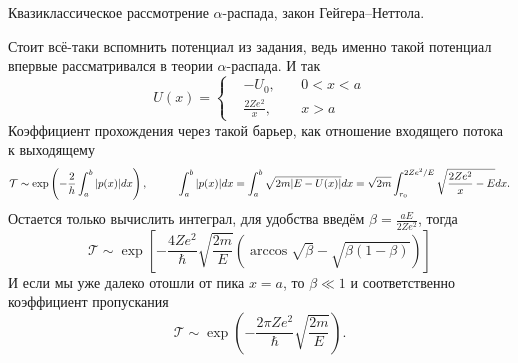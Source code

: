 \begin{leftrules}
	Квазиклассическое рассмотрение $\alpha$-распада, закон Гейгера–Неттола.
\end{leftrules}
Стоит всё-таки вспомнить потенциал из задания, ведь именно такой потенциал впервые рассматривался в теории $\alpha$-распада.
И так
\begin{equation*}
	U(x) = \left\{
	\begin{aligned}
		& - U_0, &\ &0<x<a\\
		& \tfrac{2 Z e^2}{x}, &\ &x > a
	\end{aligned}
	\right.
\end{equation*}
 Коэффициент прохождения через такой барьер, как отношение входящего потока к выходящему
 \begin{equation*}
 	\mathcal{T} \sim \exp \left( - \frac{2}{h} \int_a^b |p(x)| d x \right),
 	\hspace{1 cm}
 	\int_{a}^{b} |p(x)| d x  = \int_a^b \sqrt{2m |E - U(x)|} d x = \sqrt{2 m} \int_{r_0}^{2 Ze^2/E} \sqrt{\frac{2 Z e^2}{x} - E} d x.
 \end{equation*}
 Остается только вычислить интеграл, для удобства введём $\beta = \frac{a E}{2 Z e^2}$, тогда
 \begin{equation*}
 	\mathcal{T} \sim \exp\left[- \frac{4 Z e^2}{\hbar} \sqrt{\frac{2 m}{E}} (\arccos \sqrt{\beta} - \sqrt{\beta(1-\beta)})\right]
 \end{equation*}
 И если мы уже далеко отошли от пика $x = a$, то $\beta \ll 1$ и соответственно коэффициент пропускания
 \begin{equation*}
 	\mathcal{T} \sim \exp\left(- \frac{2 \pi Z e^2}{\hbar} \sqrt{\frac{2m}{E}}\right).
 \end{equation*}

